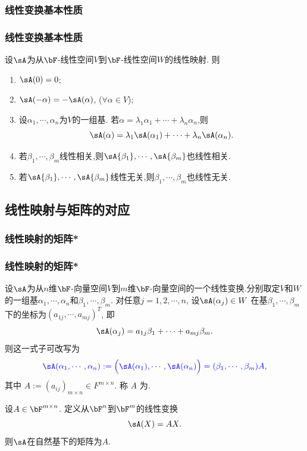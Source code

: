 \subsubsection{线性变换基本性质}
\begin{frame}\frametitle{线性变换基本性质}

\begin{proposition}[线性映射的基本性质]
设$\sA$为从$\bF$-线性空间$V$到$\bF$-线性空间$W$的线性映射.
\pp
则
\begin{enumerate}
\item $\sA(0)=0$;
\pp
\item $\sA(-\alpha) = -\sA(\alpha)$, ($\forall \alpha\in V$);
\pp
\item 设$\alpha_1,\cdots,\alpha_n$为$V$的一组基. 若$\alpha = \lambda_1\alpha_1 + \cdots + \lambda_n\alpha_n$,则
\[\sA(\alpha) = \lambda_1\sA(\alpha_1) + \cdots + \lambda_n\sA(\alpha_n).\]
\pp
{}
\pp
\item 若$\beta_1,\cdots,\beta_m$线性相关,则$\sA{\beta_1},\cdots,\sA{\beta_m}$也线性相关.
\pp
\item 若$\sA{\beta_1},\cdots,\sA{\beta_m}$线性无关,则$\beta_1,\cdots,\beta_m$也线性无关.
\end{enumerate}
\end{proposition}
\end{frame}





\subsection{线性映射与矩阵的对应}



\subsubsection{线性映射的矩阵*}
\begin{frame}\frametitle{线性映射的矩阵*}
设$\sA$为从$n$维$\bF$-向量空间$V$到$m$维$\bF$-向量空间的一个线性变换.分别取定$V$和$W$的一组基$\alpha_1,\cdots,\alpha_n$和$\beta_1,\cdots,\beta_m$.
\pp
对任意$j=1,2,\cdots,n$, 设$\sA(\alpha_j)\in W$ 在基$\beta_1,\cdots,\beta_m$下的坐标为$(a_{1j},\cdots,a_{mj})^T$,
\pp
即
\[\sA(\alpha_j) = a_{1j}\beta_1 + \cdots + a_{mj}\beta_m.\]
\pp
则这一式子可改写为
\[\blue{\sA(\alpha_1,\cdots,\alpha_n)  := \Big(\sA(\alpha_1),\cdots,\sA(\alpha_n)\Big) = (\beta_1,\cdots,\beta_m)A},\]
其中 $A:=(a_{ij})_{m\times n}\in F^{m\times n}$.
\pp
称 $A$ 为.
\pp
\begin{example}
设$A \in\bF^{m\times n}$. 定义从$\bF^n$到$\bF^m$的线性变换
\[\sA(X) = AX.\]
则$\sA$在自然基下的矩阵为$A$.
\end{example}
\pp
{}
\end{frame}





